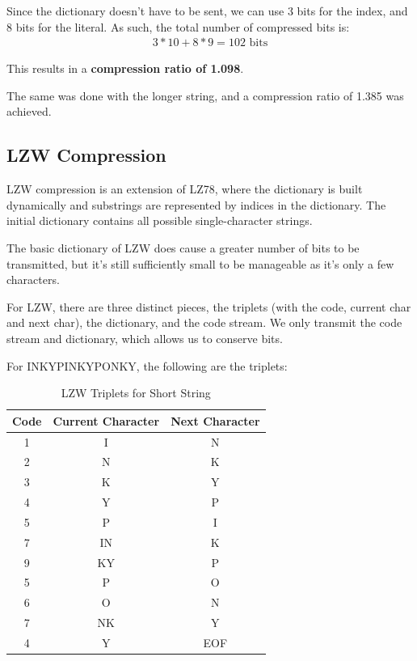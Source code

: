 \documentclass[12pt, a4paper]{AnantDocumentation}
\begin{document}
Since the dictionary doesn't have to be sent, we can use 3 bits for the index, and 8 bits for the literal. As such, the total number of compressed bits is:
\begin{align}
	3 * 10 + 8 * 9 = 102 \text{ bits}
\end{align}

This results in a \textbf{compression ratio of 1.098}.

The same was done with the longer string, and a compression ratio of 1.385 was achieved. 

\subsection{LZW Compression}
\label{subsec:lzw}
LZW compression is an extension of LZ78, where the dictionary is built dynamically and substrings are represented by indices in the dictionary. The initial dictionary contains all possible single-character strings.

The basic dictionary of LZW does cause a greater number of bits to be transmitted, but it's still sufficiently small to be manageable as it's only a few characters.

For LZW, there are three distinct pieces, the triplets (with the code, current char and next char), the dictionary, and the code stream. We only transmit the code stream and dictionary, which allows us to conserve bits.

For INKYPINKYPONKY, the following are the triplets:
\begin{table}[h!]
	\centering
	\begin{tabular}{ccc}
		\toprule
		Code & Current Character & Next Character \\
		\midrule
		1 & I & N \\
		2 & N & K \\
		3 & K & Y \\
		4 & Y & P \\
		5 & P & I \\
		7 & IN & K \\
		9 & KY & P \\
		5 & P & O \\
		6 & O & N \\
		7 & NK & Y \\
		4 & Y & EOF \\
		\bottomrule
	\end{tabular}
	\caption{LZW Triplets for Short String}
	\label{tab:lzw-triplets}
\end{table}
\end{document}
